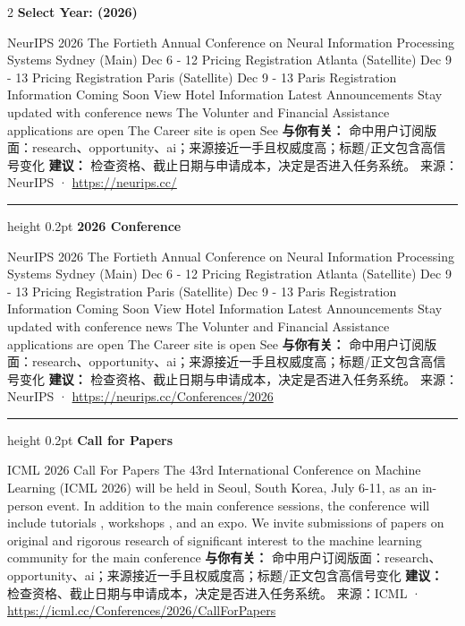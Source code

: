 \documentclass[10.5pt]{ctexart}
\begin{document}
\begin{multicols}{2}
{\large\bfseries Select Year: (2026)}\par
NeurIPS 2026 The Fortieth Annual Conference on Neural Information Processing Systems Sydney (Main) Dec 6 - 12 Pricing Registration Atlanta (Satellite) Dec 9 - 13 Pricing Registration Paris (Satellite) Dec 9 - 13 Paris Registration Information Coming Soon View Hotel Information Latest Announcements Stay updated with conference news The Volunter and Financial Assistance applications are open The Career site is open See
\textbf{与你有关：} 命中用户订阅版面：research、opportunity、ai；来源接近一手且权威度高；标题/正文包含高信号变化
\textbf{建议：} 检查资格、截止日期与申请成本，决定是否进入任务系统。
{\footnotesize\color{ormuted} 来源：NeurIPS · \url{https://neurips.cc/}}
\vspace{2mm}
\hrule height 0.2pt
\vspace{2mm}
{\large\bfseries 2026 Conference}\par
NeurIPS 2026 The Fortieth Annual Conference on Neural Information Processing Systems Sydney (Main) Dec 6 - 12 Pricing Registration Atlanta (Satellite) Dec 9 - 13 Pricing Registration Paris (Satellite) Dec 9 - 13 Paris Registration Information Coming Soon View Hotel Information Latest Announcements Stay updated with conference news The Volunter and Financial Assistance applications are open The Career site is open See
\textbf{与你有关：} 命中用户订阅版面：research、opportunity、ai；来源接近一手且权威度高；标题/正文包含高信号变化
\textbf{建议：} 检查资格、截止日期与申请成本，决定是否进入任务系统。
{\footnotesize\color{ormuted} 来源：NeurIPS · \url{https://neurips.cc/Conferences/2026}}
\vspace{2mm}
\hrule height 0.2pt
\vspace{2mm}
{\large\bfseries Call for Papers}\par
ICML 2026 Call For Papers The 43rd International Conference on Machine Learning (ICML 2026) will be held in Seoul, South Korea, July 6-11, as an in-person event. In addition to the main conference sessions, the conference will include tutorials , workshops , and an expo. We invite submissions of papers on original and rigorous research of significant interest to the machine learning community for the main conference 
\textbf{与你有关：} 命中用户订阅版面：research、opportunity、ai；来源接近一手且权威度高；标题/正文包含高信号变化
\textbf{建议：} 检查资格、截止日期与申请成本，决定是否进入任务系统。
{\footnotesize\color{ormuted} 来源：ICML · \url{https://icml.cc/Conferences/2026/CallForPapers}}

\end{multicols}
\end{document}
